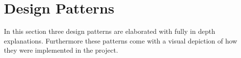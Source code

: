 \documentclass[a4paper,11pt]{article}
\begin{document}
\begin{minipage}{\linewidth}
\end{minipage}
\newpage
\section{Design Patterns \\}
In this section three design patterns are elaborated with fully in depth explanations. Furthermore these patterns come with a visual depiction of how they were implemented in the project. \\

\end{document}
